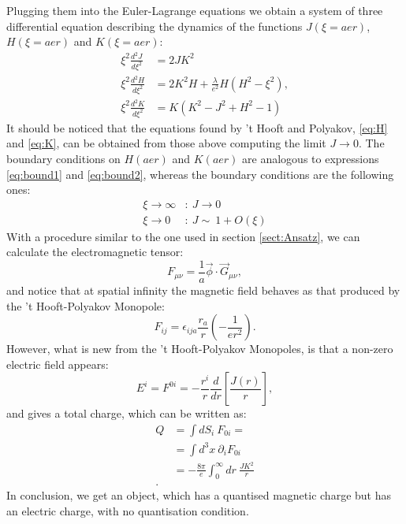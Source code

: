  Plugging  them into the Euler-Lagrange equations we obtain a system of three differential equation describing the dynamics of the functions $J(\xi = aer)$, $H(\xi = aer)$ and $K(\xi = aer)$: 
    \begin{align}
  \xi ^2 \frac{d^2 J}{d \xi^2} &= 2JK^2   \label{eq:J2}\\
  \xi ^2 \frac{d^2 H}{d \xi^2} &= 2K^2H + \frac{\lambda}{e^2}H (H^2 -\xi^2), \label{eq:K2}\\
  \xi ^2 \frac{d^2 K}{d \xi^2} &= K \left( K ^2 -J^2 + H^2 -1   \right)  \label{eq:K2}
  \end{align}
 It should be noticed that the equations found by 't Hooft and Polyakov, \ref{eq:H} and \ref{eq:K}, can be obtained from those above computing the limit $J \to 0$.
 The boundary conditions on $H(aer)$ and $K(aer)$ are analogous to expressions \ref{eq:bound1} and \ref{eq:bound2}, whereas the boundary conditions are the following ones: 
   \begin{align}
 \xi \to \infty &\colon  \ J \to 0     \label{eq:bound3}\\
 \xi  \to 0   &\colon  \ J \sim \ 1 + O(\xi)  \label{eq:bound4}
  \end{align}
\medskip
With a procedure similar to the one used in section \ref{sect:Ansatz}, we can calculate the electromagnetic tensor: 
\begin{equation}
 F_{\mu \nu} = \frac{1}{a} \vec{\phi} \cdot \vec{G}_{\mu \nu },
\end{equation}
and notice that at spatial infinity the magnetic field behaves as that produced by the 't Hooft-Polyakov Monopole: 
\begin{equation}
F_{ij}= \epsilon_{ija} \frac{r_a}{r} \left(   - \frac{1}{er^2}    \right).
\end{equation}
However, what is new from the 't Hooft-Polyakov Monopoles, is that a non-zero electric field appears: 
\begin{equation}
E^i = F^{0i}= - \frac{r^i}{r} \frac{d}{dr} \left[ \frac{J(r)}{r} \right],
\end{equation}
and gives a total charge, which can be written as: 
\begin{equation}
\begin{split}
Q &= \int dS_i \  F_{0i} = \\
  &= \int d^3 x \ \partial_i F_{0i}\\
  &= - \frac{8 \pi }{e}\int_0^{\infty} dr \ \frac{JK^2}{r}\\.
\end{split}
\end{equation}
In conclusion, we get an object, which has a quantised magnetic charge but has an electric charge, with no quantisation condition. 
